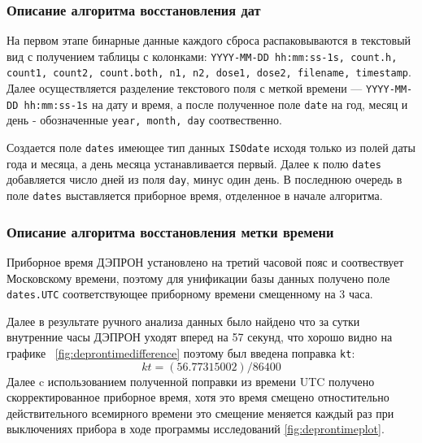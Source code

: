 \documentclass[a4paper,14pt]{extreport}
\begin{document}
	\subsubsection{Описание алгоритма восстановления дат}
	
	На первом этапе  бинарные данные каждого сброса распаковываются в текстовый вид 
	с получением таблицы с колонками: \texttt{YYYY-MM-DD hh:mm:ss-1s,	count.h,	
		count1,	count2,	count.both,	n1,	n2,	dose1, dose2,	filename,	timestamp}. 
	Далее осуществляется разделение текстового поля с меткой времени --- 
	\texttt{YYYY-MM-DD hh:mm:ss-1s} на дату и время, а после полученное поле 
	\texttt{date} на год, месяц и день - обозначенные \texttt{year, month, day} 
	соотвественно.
	
	Создается поле \texttt{dates} имеющее тип данных \texttt{ISOdate} исходя только 
	из полей даты года и месяца, а день месяца устанавливается первый. Далее к полю 
	\texttt{dates} 
	добавляется число дней из поля \texttt{day}, минус один день. В последнюю 
	очередь в поле \texttt{dates} выставляется приборное время, отделенное в начале 
	алгоритма.
	
	\subsubsection{Описание алгоритма восстановления метки времени}
	
	Приборное время ДЭПРОН установлено на третий часовой пояс и соотвествует 
	Московскому 
	времени, поэтому для унификации базы данных получено поле \texttt{dates.UTC} 
	соответствующее приборному времени смещенному на 3 часа.
	
	
	
	Далее в результате ручного анализа данных было найдено что за сутки внутренние 
	часы ДЭПРОН уходят вперед на 57 секунд, что хорошо видно на графике~
	\ref{fig:deprontimedifference} поэтому был введена поправка \texttt{kt}:
	\[ kt = (56.77315002) /86400 \]
	Далее c использованием полученной поправки из времени UTC получено 
	скорректированное приборное время, хотя это время смещено отностительно 
	действительного всемирного времени это смещение меняется каждый раз при 
	выключениях прибора в ходе программы исследований \ref{fig:deprontimeplot}. 
	
\end{document}

